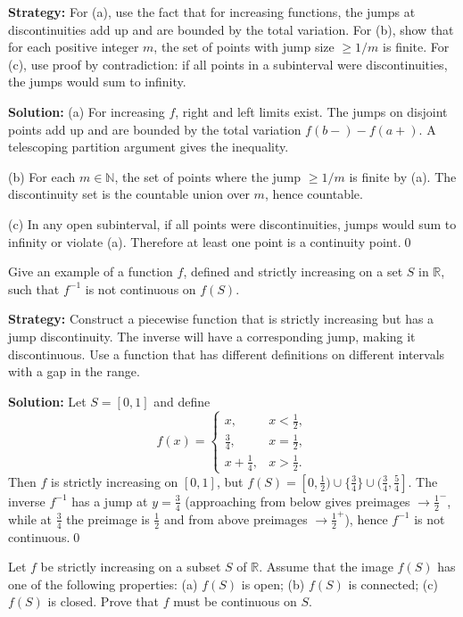 \noindent\textbf{Strategy:} For (a), use the fact that for increasing functions, the jumps at discontinuities add up and are bounded by the total variation. For (b), show that for each positive integer $m$, the set of points with jump size $\geq 1/m$ is finite. For (c), use proof by contradiction: if all points in a subinterval were discontinuities, the jumps would sum to infinity.

\bigskip\noindent\textbf{Solution:}
(a) For increasing $f$, right and left limits exist. The jumps on disjoint points add up and are bounded by the total variation $f(b-)-f(a+)$. A telescoping partition argument gives the inequality.

(b) For each $m\in\mathbb{N}$, the set of points where the jump $\ge 1/m$ is finite by (a). The discontinuity set is the countable union over $m$, hence countable.

(c) In any open subinterval, if all points were discontinuities, jumps would sum to infinity or violate (a). Therefore at least one point is a continuity point.\qed



\begin{problembox}
Give an example of a function $f$, defined and strictly increasing on a set $S$ in $\mathbb{R}$, such that $f^{-1}$ is not continuous on $f(S)$.
\end{problembox}

\noindent\textbf{Strategy:} Construct a piecewise function that is strictly increasing but has a jump discontinuity. The inverse will have a corresponding jump, making it discontinuous. Use a function that has different definitions on different intervals with a gap in the range.

\bigskip\noindent\textbf{Solution:}
Let $S=[0,1]$ and define
\[
f(x)=\begin{cases}
x,& x<\tfrac12,\\
\tfrac34,& x=\tfrac12,\\
x+\tfrac14,& x>\tfrac12.
\end{cases}
\]
Then $f$ is strictly increasing on $[0,1]$, but $f(S)=[0,\tfrac12)\cup\{\tfrac34\}\cup(\tfrac34,\tfrac54]$. The inverse $f^{-1}$ has a jump at $y=\tfrac34$ (approaching from below gives preimages $\to\tfrac12^-$, while at $\tfrac34$ the preimage is $\tfrac12$ and from above preimages $\to\tfrac12^+$), hence $f^{-1}$ is not continuous.\qed



\begin{problembox}
Let $f$ be strictly increasing on a subset $S$ of $\mathbb{R}$. Assume that the image $f(S)$ has one of the following properties: 
(a) $f(S)$ is open; (b) $f(S)$ is connected; (c) $f(S)$ is closed. Prove that $f$ must be continuous on $S$.
\end{problembox}

